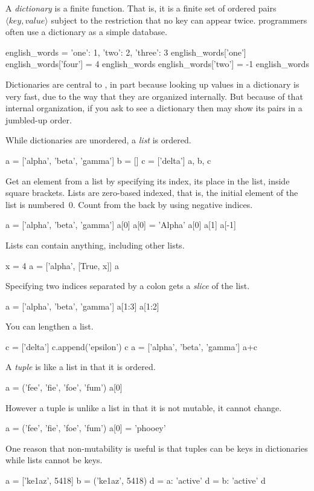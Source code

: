 A \python{} \textit{dictionary} is a finite function.
That is, it is a finite
set of ordered pairs $\langle\textit{key},\textit{value}\rangle$ subject 
to the restriction that no key can appear twice.
\python{} programmers often use a dictionary as a simple database.
\begin{pythonconsole}
english_words = {'one': 1, 'two': 2, 'three': 3}
english_words['one']
english_words['four'] = 4  
english_words
english_words['two'] = -1
english_words
\end{pythonconsole}
\noindent 
Dictionaries are central to \python, in part because looking up values 
in a dictionary is very fast, due to the way that they are 
organized internally.
But because of that internal organization,
if you ask to see a dictionary then \python{} may show its pairs in 
a jumbled-up order.

While dictionaries are unordered, a \textit{list} is ordered.
\begin{pythonconsole}
a = ['alpha', 'beta', 'gamma']
b = []
c = ['delta']
a, b, c
\end{pythonconsole}
\noindent
Get an element from a list by specifying its index, its place in the list,
inside square brackets.
Lists are zero-based indexed, that is, the initial element of the
list is numbered~$0$.
Count from the back by using negative indices.
\begin{pythonconsole}
a = ['alpha', 'beta', 'gamma']
a[0]
a[0] = 'Alpha'
a[0]
a[1]
a[-1]
\end{pythonconsole}
\noindent
Lists can contain anything, including other lists.
\begin{pythonconsole}
x = 4
a = ['alpha', [True, x]]
a
\end{pythonconsole}
\noindent
Specifying two indices separated by a colon gets a \textit{slice} 
of the list. 
\begin{pythonconsole} 
a = ['alpha', 'beta', 'gamma']
a[1:3]
a[1:2]
\end{pythonconsole}
\noindent
You can lengthen a list.
\begin{pythonconsole}
c = ['delta']
c.append('epsilon')
c
a = ['alpha', 'beta', 'gamma']
a+c
\end{pythonconsole}

A \textit{tuple} is like a list in that it is ordered.
\begin{pythonconsole}
a = ('fee', 'fie', 'foe', 'fum')
a[0]
\end{pythonconsole}
\noindent
However a tuple is unlike a list 
in that it is not mutable, it cannot change.
\begin{pythonconsole}
a = ('fee', 'fie', 'foe', 'fum')
a[0] = 'phooey'
\end{pythonconsole}
\noindent
One reason that non-mutability is useful is that 
tuples can be keys in dictionaries while lists cannot be keys.
\begin{pythonconsole}
a = ['ke1az', 5418]
b = ('ke1az', 5418)
d = {a: 'active'}
d = {b: 'active'}
d
\end{pythonconsole}

